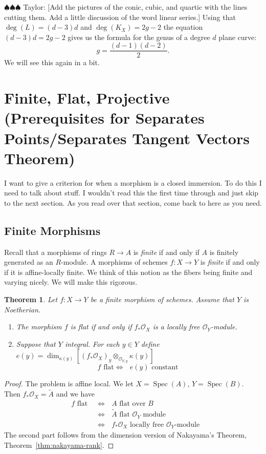 \documentclass[12pt]{article}
\numberwithin{equation}{section}
\newtheorem{theorem}{Theorem}[subsection]
\theoremstyle{definition}
\theoremstyle{remark}
\newcommand{\Ocal}{\mathcal{O}}
\newcommand{\Spec}{\operatorname{Spec}}
\newcommand{\taylor}[1]{{\color{blue} \sf $\spadesuit\spadesuit\spadesuit$ Taylor: [#1]}}
\begin{document}
\taylor{Add the pictures of the conic, cubic, and quartic with the lines cutting them.
Add a little discussion of the word linear series.}
Using that $\deg(L) = (d-3)d$ and $\deg(K_X)=2g-2$ the equation $(d-3)d=2g-2$ gives us the formula for the genus of a degree $d$ plane curve:
 $$ g = \dfrac{(d-1)(d-2)}{2}.$$
We will see this again in a bit. 


\section{Finite, Flat, Projective (Prerequisites for Separates Points/Separates Tangent Vectors Theorem)}
I want to give a criterion for when a morphism is a closed immersion. 
To do this I need to talk about stuff. 
I wouldn't read this the first time through and just skip to the next section. 
As you read over that section, come back to here as you need.

\subsection{Finite Morphisms}
Recall that a morphisms of rings $R\to A$ is \emph{finite} if and only if $A$ is finitely generated as an $R$-module. 
A morphisms of schemes $f:X\to Y$ is \emph{finite} if and only if it is affine-locally finite.
We think of this notion as the fibers being finite and varying nicely. 
We will make this rigorous. 

\begin{theorem}
	Let $f:X\to Y$ be a finite morphism of schemes. 
	Assume that $Y$ is Noetherian. 
	\begin{enumerate}
		\item The morphism $f$ is flat if and only if $f_*\Ocal_X$ is a locally free $\Ocal_Y$-module.
		\item 	Suppose that $Y$ integral. 
		For each $y\in Y$ define $e(y) = \dim_{\kappa(y)}\left[ (f_*\Ocal_{X})_y \otimes_{\Ocal_{Y,y}}\kappa(y) \right]$
		$$ \mbox{$f$ flat} \iff \mbox{ $e(y)$ constant } $$
	\end{enumerate} 
\end{theorem}
\begin{proof}
	The problem is affine local. 
	We let $X = \Spec(A)$, $Y=\Spec(B)$. 
	Then $f_*\Ocal_X = \widetilde{A}$ and we have 
	\begin{align*}
	\mbox{ $f$ flat }&\iff \mbox{ $A$ flat over $B$ }\\
	& \iff \mbox{ $\widetilde{A}$ flat $\Ocal_Y$ module} \\
	& \iff \mbox{ $f_*\Ocal_X$ locally free $\Ocal_Y$-module}
	\end{align*}
	The second part follows from the dimension version of Nakayama's Theorem, Theorem~\ref{thm:nakayama-rank}.
\end{proof}
\end{document}
